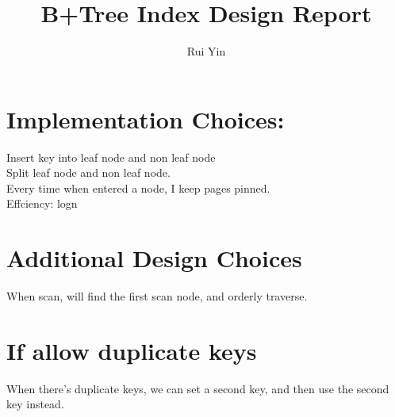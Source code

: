 \documentclass[11.5pt]{article}
\begin{document}
	
	
\title{B+Tree Index Design Report}
\author{Rui Yin}
\maketitle
\section {Implementation Choices:}
\begin{enumerate}
 Insert key into leaf node and non leaf node\\
Split leaf node and non leaf node.\\
Every time when entered a node, I keep pages pinned.  \\
Effciency: logn
\end{enumerate}


\section {Additional Design Choices}
\begin{enumerate}
When scan, will find the first scan node, and orderly traverse. 
\end{enumerate}

\section {If allow duplicate keys}
\begin{enumerate}
When there's duplicate keys, we can set a second key, and then use the second key instead. 
\end{enumerate}
\end{document}
